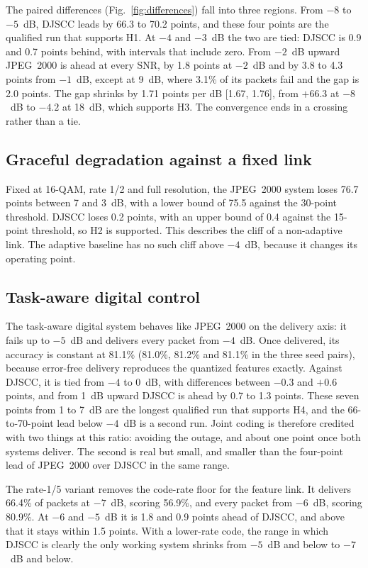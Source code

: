 \documentclass[conference]{IEEEtran}
\begin{document}
The paired differences (Fig.~\ref{fig:differences}) fall into three regions. From $-8$ to $-5$~dB, DJSCC leads by 66.3 to 70.2 points, and these four points are the qualified run that supports H1. At $-4$ and $-3$~dB the two are tied: DJSCC is 0.9 and 0.7 points behind, with intervals that include zero. From $-2$~dB upward JPEG~2000 is ahead at every SNR, by 1.8 points at $-2$~dB and by 3.8 to 4.3 points from $-1$~dB, except at 9~dB, where 3.1\% of its packets fail and the gap is 2.0 points. The gap shrinks by 1.71 points per dB [1.67, 1.76], from $+66.3$ at $-8$~dB to $-4.2$ at 18~dB, which supports H3. The convergence ends in a crossing rather than a tie.

\subsection{Graceful degradation against a fixed link}
Fixed at 16-QAM, rate 1/2 and full resolution, the JPEG~2000 system loses 76.7 points between 7 and 3~dB, with a lower bound of 75.5 against the 30-point threshold. DJSCC loses 0.2 points, with an upper bound of 0.4 against the 15-point threshold, so H2 is supported. This describes the cliff of a non-adaptive link. The adaptive baseline has no such cliff above $-4$~dB, because it changes its operating point.

\subsection{Task-aware digital control}
The task-aware digital system behaves like JPEG~2000 on the delivery axis: it fails up to $-5$~dB and delivers every packet from $-4$~dB. Once delivered, its accuracy is constant at 81.1\% (81.0\%, 81.2\% and 81.1\% in the three seed pairs), because error-free delivery reproduces the quantized features exactly. Against DJSCC, it is tied from $-4$ to 0~dB, with differences between $-0.3$ and $+0.6$ points, and from 1~dB upward DJSCC is ahead by 0.7 to 1.3 points. These seven points from 1 to 7~dB are the longest qualified run that supports H4, and the 66-to-70-point lead below $-4$~dB is a second run. Joint coding is therefore credited with two things at this ratio: avoiding the outage, and about one point once both systems deliver. The second is real but small, and smaller than the four-point lead of JPEG~2000 over DJSCC in the same range.

The rate-1/5 variant removes the code-rate floor for the feature link. It delivers 66.4\% of packets at $-7$~dB, scoring 56.9\%, and every packet from $-6$~dB, scoring 80.9\%. At $-6$ and $-5$~dB it is 1.8 and 0.9 points ahead of DJSCC, and above that it stays within 1.5 points. With a lower-rate code, the range in which DJSCC is clearly the only working system shrinks from $-5$~dB and below to $-7$~dB and below.
\end{document}

